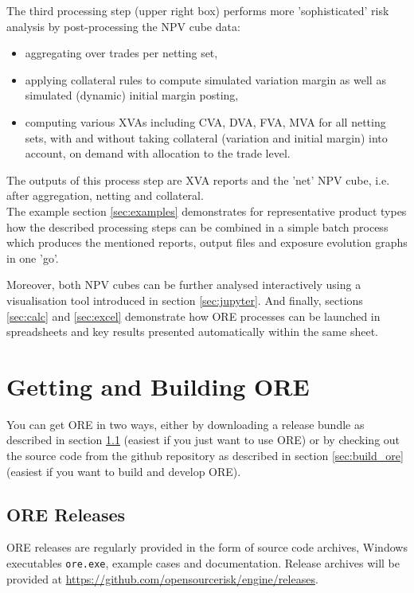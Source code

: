 \documentclass[12pt, a4paper]{article}
\begin{document}
The third processing step (upper right box) performs more 'sophisticated' risk ana\-ly\-sis by post-processing the NPV
cube data:
\begin{itemize}
\item aggregating over trades per netting set, 
\item applying collateral rules to compute simulated variation margin as well as simulated (dynamic) initial margin
  posting,
\item computing various XVAs including CVA, DVA, FVA, MVA for all netting sets, with and without taking collateral
  (variation and initial margin) into account, on demand with allocation to the trade level.
\end{itemize}
The outputs of this process step are XVA reports and the 'net' NPV cube, i.e. after aggregation, netting and collateral. \\

The example section \ref{sec:examples} demonstrates for representative product types how the described processing steps
can be combined in a simple batch process which produces the mentioned reports, output files and exposure evolution
graphs in one 'go'.

Moreover, both NPV cubes can be further analysed interactively using a visualisation tool introduced in section
\ref{sec:jupyter}. And finally, sections \ref{sec:calc} and \ref{sec:excel} demonstrate how ORE processes can be
launched in spreadsheets and key results presented automatically within the same sheet.

\section{Getting and Building ORE}\label{sec:installation}

You can get ORE in two ways, either by downloading a release bundle as described in section \ref{sec:release} (easiest if you just want to use ORE) or by
checking out the source code from the github repository as described in section \ref{sec:build_ore} (easiest if you want to build and develop ORE).

\subsection{ORE Releases}\label{sec:release}

ORE releases are regularly provided in the form of source code archives, Windows exe\-cutables {\tt ore.exe}, example
cases and documentation. Release archives will be provided at \url{https://github.com/opensourcerisk/engine/releases}.
\end{document}
